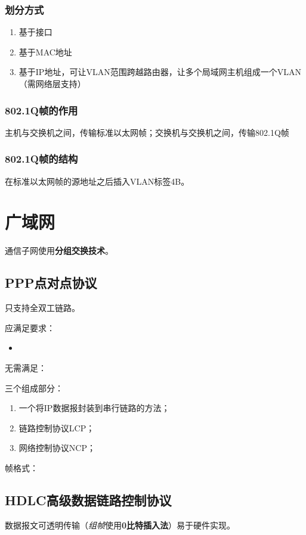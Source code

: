 \subsubsection{划分方式}
\begin{enumerate}
    \item 基于接口
    \item 基于MAC地址
    \item 基于IP地址，可让VLAN范围跨越路由器，让多个局域网主机组成一个VLAN（需网络层支持）
\end{enumerate}


\subsubsection{802.1Q帧的作用}
主机与交换机之间，传输标准以太网帧；交换机与交换机之间，传输802.1Q帧


\subsubsection{802.1Q帧的结构}
在标准以太网帧的源地址之后插入VLAN标签4B。


\section{广域网}

通信子网使用\textbf{分组交换技术}。

\subsection{PPP点对点协议}
只支持全双工链路。

应满足要求：\begin{itemize}
    \item 
\end{itemize}

无需满足：

三个组成部分：\begin{enumerate}
    \item 一个将IP数据报封装到串行链路的方法；
    \item 链路控制协议LCP；
    \item 网络控制协议NCP；
\end{enumerate}

帧格式：


\subsection{HDLC高级数据链路控制协议}
数据报文可透明传输（\textit{组帧}使用\textbf{0比特插入法}）易于硬件实现。

